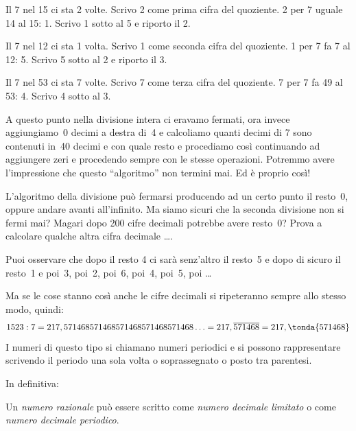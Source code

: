 \begin{minipage}[]{.39\textwidth}
Il 7 nel 15 ci sta 2 volte. Scrivo 2 come prima cifra del quoziente.
2 per 7 uguale 14 al 15: 1. Scrivo 1 sotto al 5 e riporto il 2.

Il 7 nel 12 ci sta 1 volta. Scrivo 1 come seconda cifra del quoziente.
1 per 7 fa 7 al 12: 5. Scrivo 5 sotto al 2 e riporto il 3.

Il 7 nel 53 ci sta 7 volte. Scrivo 7 come terza cifra del quoziente.
7 per 7 fa 49 al 53: 4. Scrivo 4 sotto al 3.

\end{minipage}
\begin{minipage}[]{.59\textwidth}
\begin{center}\end{center}
\end{minipage}

A questo punto nella divisione intera ci eravamo fermati, ora invece 
aggiungiamo~0 decimi a destra di~4 e calcoliamo quanti decimi di 7 sono 
contenuti in~40 decimi e con quale resto e procediamo così continuando ad 
aggiungere zeri e procedendo sempre con le stesse operazioni.
Potremmo avere l'impressione che questo ``algoritmo'' non termini mai. 
Ed è proprio così!

L'algoritmo della divisione può fermarsi producendo ad un certo punto il 
resto~0, oppure andare avanti all'infinito. Ma siamo sicuri che la seconda 
divisione non si fermi mai? Magari dopo 200 cifre decimali potrebbe avere 
resto~0? Prova a calcolare qualche altra cifra decimale \dots.

Puoi osservare che dopo il resto 4 ci sarà senz'altro il resto~5 e dopo di 
sicuro il resto~1 e poi~3, poi~2, poi~6, poi~4, poi~5, poi \dots

Ma se le cose stanno così anche le cifre decimali si ripeteranno sempre 
allo stesso modo, quindi:
\[1523 : 7 = 217,571468571468571468571468571468\ldots = 
217,\overline{571468} = 217,\tonda{571468}\]
I numeri di questo tipo si chiamano numeri periodici e si possono 
rappresentare scrivendo il periodo una sola volta o soprassegnato o posto 
tra parentesi.

In definitiva:

\begin{definizione}
 Un \emph{numero razionale} può essere scritto come \emph{numero decimale 
limitato} o come \emph{numero decimale periodico}.
\end{definizione}


